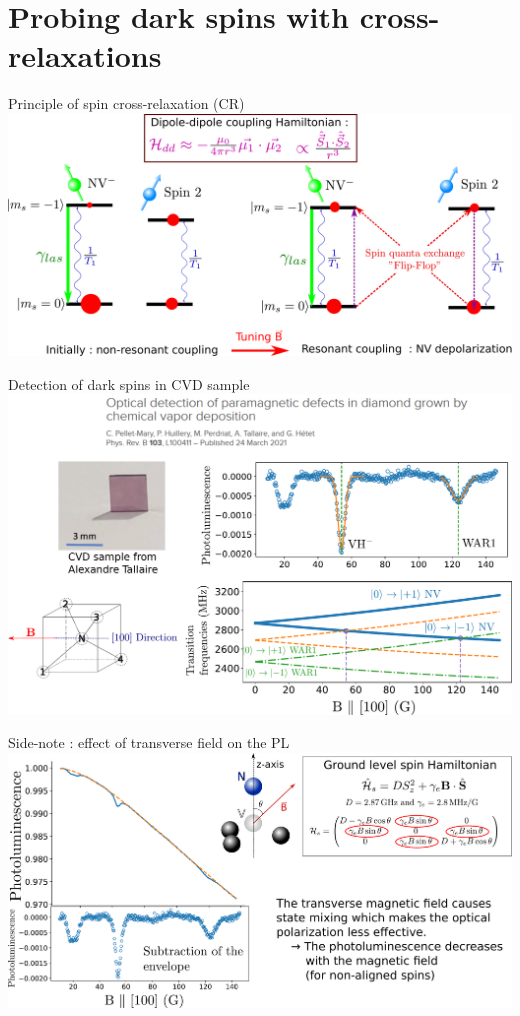 \documentclass{beamer}
\begin{document}
\section{Probing dark spins with cross-relaxations}
\begin{frame}
\tableofcontents[currentsection]
\end{frame}
\begin{frame}{Principle of spin cross-relaxation (CR)}
\centering
\includegraphics[scale=.23]{Slide_CR}
\end{frame}
\begin{frame}{Detection of dark spins in CVD sample}
\centering
\includegraphics[scale=.35]{Slide_CR_CVD}
\end{frame}
\begin{frame}{Side-note : effect of transverse field on the PL}
\centering
\includegraphics[scale=.18]{slide_champ_transverse}
\end{frame}
\end{document}
